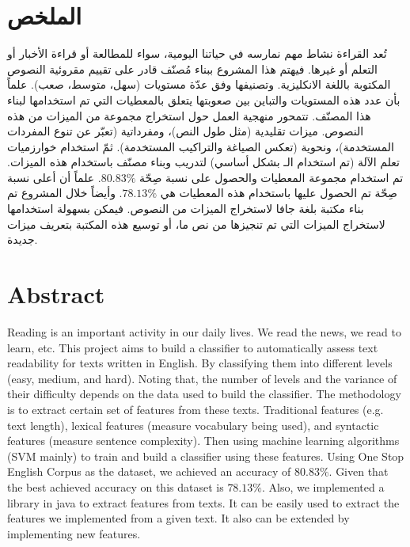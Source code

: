 

\section*{الملخص}
تُعد القراءة نشاط مهم نمارسه في حياتنا اليومية،
سواء للمطالعة أو قراءة الأخبار أو التعلم أو غيرها.
فيهتم هذا المشروع ببناء مُصنّف قادر على تقييم مقروئية النصوص المكتوبة باللغة الانكليزية.
وتصنيفها وفق عدّة مستويات (سهل، متوسط، صعب).
علماً بأن عدد هذه المستويات والتباين بين صعوبتها يتعلق بالمعطيات التي تم استخدامها لبناء هذا المصنّف.
تتمحور منهجية العمل حول استخراج مجموعة من الميزات من هذه النصوص.
ميزات تقليدية (مثل طول النص)، ومفرداتية (تعبّر عن تنوع المفردات المستخدمة)، ونحوية (تعكس الصياغة والتراكيب المستخدمة).
ثمّ استخدام خوارزميات تعلم الآلة (تم استخدام الـ  بشكل أساسي) لتدريب وبناء مصنّف باستخدام هذه الميزات.
تم استخدام مجموعة المعطيات  والحصول على نسبة صِحّة $80.83\%$.
علماً أن أعلى نسبة صِحّة تم الحصول عليها باستخدام هذه المعطيات هي $78.13\%$.
وأيضاً خلال المشروع تم بناء مكتبة بلغة جافا لاستخراج الميزات من النصوص.
فيمكن بسهولة استخدامها لاستخراج الميزات التي تم تنجيزها من نص ما، أو توسيع هذه المكتبة بتعريف ميزات جديدة.


\vfill
{}
\section*{Abstract}

Reading is an important activity in our daily lives.
We read the news, we read to learn, etc.
This project aims to build a classifier to automatically assess text readability for texts written in English.
By classifying them into different levels (easy, medium, and hard).
Noting that, the number of levels and the variance of their difficulty depends on the data used to build the classifier.
The methodology is to extract certain set of features from these texts.
Traditional features (e.g. text length), lexical features (measure vocabulary being used),
and syntactic features (measure sentence complexity).
Then using machine learning algorithms (SVM mainly) to train and build a classifier using these features.
Using One Stop English Corpus as the dataset, we achieved an accuracy of $80.83\%$.
Given that the best achieved accuracy on this dataset is $78.13\%$.
Also, we implemented a library in java to extract features from texts.
It can be easily used to extract the features we implemented from a given text.
It also can be extended by implementing new features.






